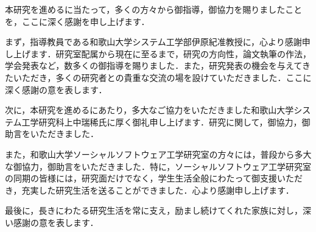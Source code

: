 \documentclass[11pt]{jreport}
\begin{document}
\begin{acknowledgements}
本研究を進めるに当たって，多くの方々から御指導，御協力を賜りましたことを，ここに深く感謝を申し上げます．

まず，指導教員である和歌山大学システム工学部伊原紀准教授に，心より感謝申し上げます．研究室配属から現在に至るまで，研究の方向性，論文執筆の作法，学会発表など，数多くの御指導を賜りました．また，研究発表の機会を与えてきたいただき，多くの研究者との貴重な交流の場を設けていただきました．ここに深く感謝の意を表します．

次に，本研究を進めるにあたり，多大なご協力をいただきました和歌山大学システム工学研究科上中瑞稀氏に厚く御礼申し上げます．研究に関して，御協力，御助言をいただきました．

また，和歌山大学ソーシャルソフトウェア工学研究室の方々には，普段から多大な御協力，御助言をいただきました．特に，ソーシャルソフトウェア工学研究室の同期の皆様には，研究面だけでなく，学生生活全般にわたって御支援いただき，充実した研究生活を送ることができました．心より感謝申し上げます．

最後に，長きにわたる研究生活を常に支え，励まし続けてくれた家族に対し，深い感謝の意を表します．





\end{acknowledgements}



\end{document}
